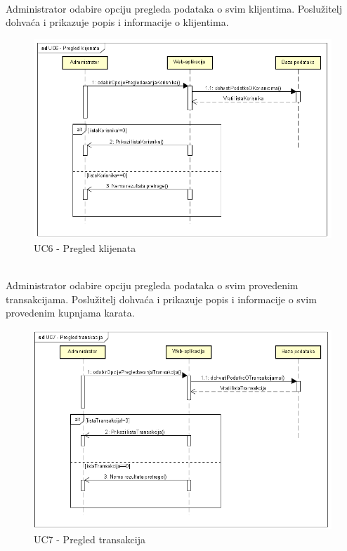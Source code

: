 				\noindent {}\\
				{Administrator odabire opciju pregleda podataka o svim klijentima. Poslužitelj dohvaća i prikazuje popis i informacije o klijentima.}\\
				
				\begin{figure}[H]
					\centering
					\includegraphics[width=1\linewidth]{"slike/UC6-sekvencijski"}
					\caption{UC6 - Pregled klijenata}
					\label{fig:UC-pregled-klijenata}
				\end{figure}

				\noindent {}\\
				{Administrator odabire opciju pregleda podataka o svim provedenim transakcijama. Poslužitelj dohvaća i prikazuje popis i informacije o svim provedenim kupnjama karata.}\\
				
				\begin{figure}[H]
					\centering
					\includegraphics[width=1\linewidth]{"slike/UC7-sekvencijski"}
					\caption{UC7 - Pregled transakcija}
					\label{fig:UC-pregled-transakcija}
				\end{figure}

